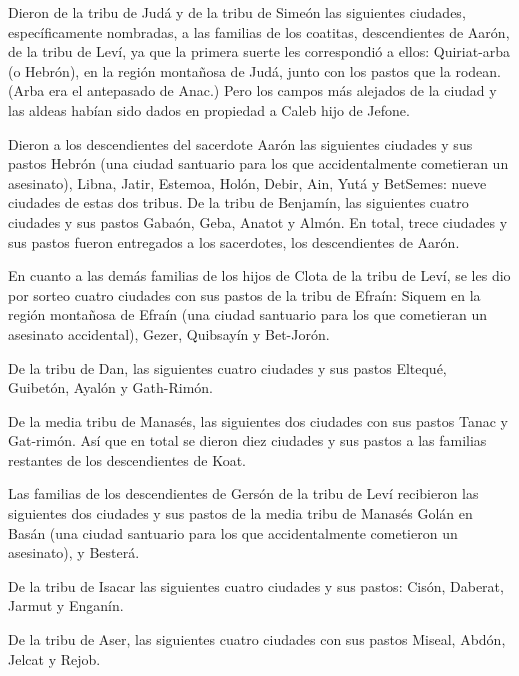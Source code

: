 Dieron de la tribu de Judá y de la tribu de Simeón las
siguientes ciudades, específicamente nombradas,  a las
familias de los coatitas, descendientes de Aarón, de la tribu de Leví,
ya que la primera suerte les correspondió a ellos: 
Quiriat-arba (o Hebrón), en la región montañosa de Judá, junto con los
pastos que la rodean. (Arba era el antepasado de Anac.) 
Pero los campos más alejados de la ciudad y las aldeas habían sido dados
en propiedad a Caleb hijo de Jefone.

 Dieron a los descendientes del sacerdote Aarón las
siguientes ciudades y sus pastos Hebrón (una ciudad santuario para los
que accidentalmente cometieran un asesinato), Libna, 
Jatir, Estemoa,  Holón, Debir,  Ain, Yutá y
BetSemes: nueve ciudades de estas dos tribus.  De la tribu
de Benjamín, las siguientes cuatro ciudades y sus pastos Gabaón, Geba,
 Anatot y Almón.  En total, trece ciudades y
sus pastos fueron entregados a los sacerdotes, los descendientes de
Aarón.

 En cuanto a las demás familias de los hijos de Clota de la
tribu de Leví, se les dio por sorteo cuatro ciudades con sus pastos de
la tribu de Efraín:  Siquem en la región montañosa de
Efraín (una ciudad santuario para los que cometieran un asesinato
accidental), Gezer,  Quibsayín y Bet-Jorón.

 De la tribu de Dan, las siguientes cuatro ciudades y sus
pastos Eltequé, Guibetón,  Ayalón y Gath-Rimón.

 De la media tribu de Manasés, las siguientes dos ciudades
con sus pastos Tanac y Gat-rimón.  Así que en total se
dieron diez ciudades y sus pastos a las familias restantes de los
descendientes de Koat.

 Las familias de los descendientes de Gersón de la tribu de
Leví recibieron las siguientes dos ciudades y sus pastos de la media
tribu de Manasés Golán en Basán (una ciudad santuario para los que
accidentalmente cometieron un asesinato), y Besterá.

 De la tribu de Isacar las siguientes cuatro ciudades y sus
pastos: Cisón, Daberat,  Jarmut y Enganín.

 De la tribu de Aser, las siguientes cuatro ciudades con
sus pastos Miseal, Abdón,  Jelcat y Rejob.

